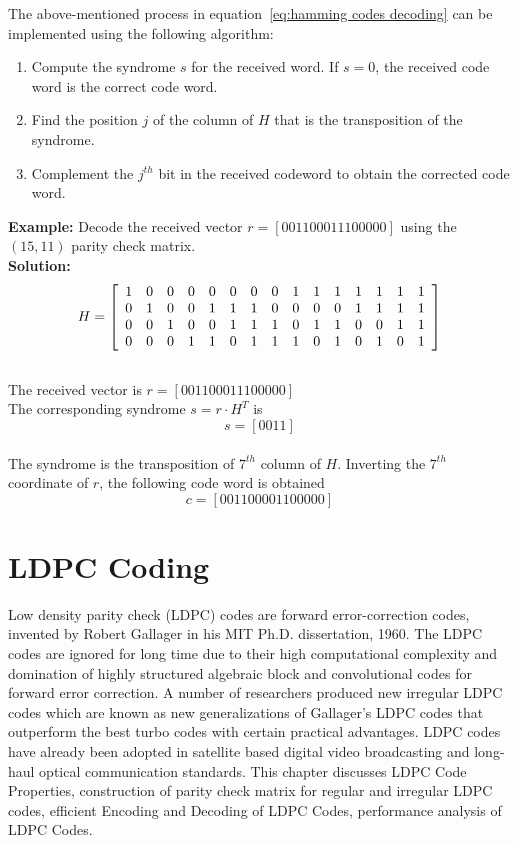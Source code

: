 The above-mentioned process in equation~\ref{eq:hamming codes decoding} can be implemented using the following algorithm:
\begin{enumerate}
    \item Compute the syndrome $s$ for the received word. If $s = 0$, the received code word is the correct code word.
    \item Find the position $j$ of the column of $H$ that is the transposition of the syndrome.
    \item Complement the $j^{th}$ bit in the received codeword to obtain the corrected code word. \\
\end{enumerate}

\textbf{Example:} Decode the received vector $r = [001100011100000]$ using the $(15,11)$ parity check matrix. \\
\textbf{Solution:} \\
\[
H = \left[ \begin{array}{c c c c c c c c c c c c c c c}
    1&0&0&0&0&0&0&0&1&1&1&1&1&1&1 \\
    0&1&0&0&1&1&1&0&0&0&0&1&1&1&1 \\
    0&0&1&0&0&1&1&1&0&1&1&0&0&1&1 \\
    0&0&0&1&1&0&1&1&1&0&1&0&1&0&1    
\end{array} \right]
\] \\
The received vector is $r = [001100011100000]$ \\
The corresponding syndrome $s = r \cdot H^T$ is \\
\[s = [0011]\] \\
The syndrome is the transposition of $7^{th}$ column of $H$. Inverting the $7^{th}$ coordinate of $r$, the following code word is obtained \\
\[c = [001100001100000]\]

\section{LDPC Coding}
Low density parity check (LDPC) codes are forward error-correction codes, invented by Robert Gallager in his MIT Ph.D. dissertation, 1960. The LDPC codes are ignored for long time due to their high computational complexity and domination of highly structured algebraic block and convolutional codes for forward error correction. A number of researchers produced new irregular LDPC codes which are known as new generalizations of Gallager's LDPC codes that outperform the best turbo codes with certain practical advantages. LDPC codes have already been adopted in satellite based digital video broadcasting and long-haul optical communication standards. This chapter discusses LDPC Code Properties, construction of parity check matrix for regular and irregular LDPC codes, efficient Encoding and Decoding of LDPC Codes, performance analysis of LDPC Codes.

